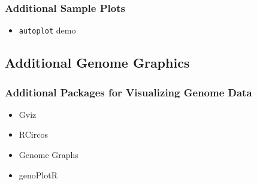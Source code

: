 \documentclass{beamer}
\newcommand{\Rfunction}[1]{{\texttt{#1}}}
\begin{document}
\begin{frame}[containsverbatim]  
	\frametitle{Additional Sample Plots}
\begin{itemize}
	\item \Rfunction{autoplot} demo \href{http://www.tengfei.name/ggbio/docs/man/autoplot-method.html}{{}}
\end{itemize}
\end{frame}
\subsection{Additional Genome Graphics}
\begin{frame}[containsverbatim]  
	\frametitle{Additional Packages for Visualizing Genome Data}
\footnotesize 
\begin{itemize}
	\item Gviz \href{http://www.bioconductor.org/packages/devel/bioc/html/Gviz.html}{{}}
	\item RCircos \citep{Zhang2013a} \href{http://cran.us.r-project.org/web/packages/RCircos/index.html}{{}}
	\item Genome Graphs \href{http://bioconductor.org/packages/release/bioc/html/GenomeGraphs.html}{{}}
	\item genoPlotR \href{http://genoplotr.r-forge.r-project.org/}{{}}
\end{itemize}
\end{frame}
\end{document}
